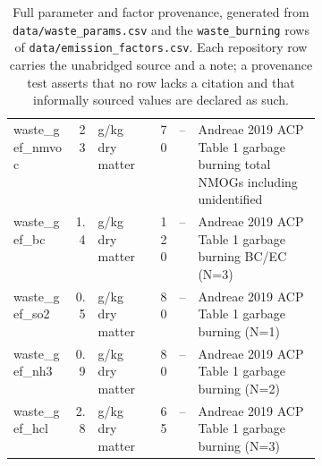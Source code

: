 \begin{table}[htbp]
\begin{tabular}{@{}lrlrlp{0.40\linewidth}@{}}
waste\_gef\_nmvoc & 23 & g/kg dry matter & 70 & -- & Andreae 2019 ACP Table 1 garbage burning total NMOGs including unidentified \\
waste\_gef\_bc & 1.4 & g/kg dry matter & 120 & -- & Andreae 2019 ACP Table 1 garbage burning BC/EC (N=3) \\
waste\_gef\_so2 & 0.5 & g/kg dry matter & 80 & -- & Andreae 2019 ACP Table 1 garbage burning (N=1) \\
waste\_gef\_nh3 & 0.9 & g/kg dry matter & 80 & -- & Andreae 2019 ACP Table 1 garbage burning (N=2) \\
waste\_gef\_hcl & 2.8 & g/kg dry matter & 65 & -- & Andreae 2019 ACP Table 1 garbage burning (N=3) \\
\bottomrule
\end{tabular}
\caption{Full parameter and factor provenance, generated from
\texttt{data/waste\_params.csv} and the \texttt{waste\_burning} rows of
\texttt{data/emission\_factors.csv}. Each repository row carries the
unabridged source and a note; a provenance test asserts that no row lacks a
citation and that informally sourced values are declared as such.}
\label{tab:ef-full}
\end{table}
